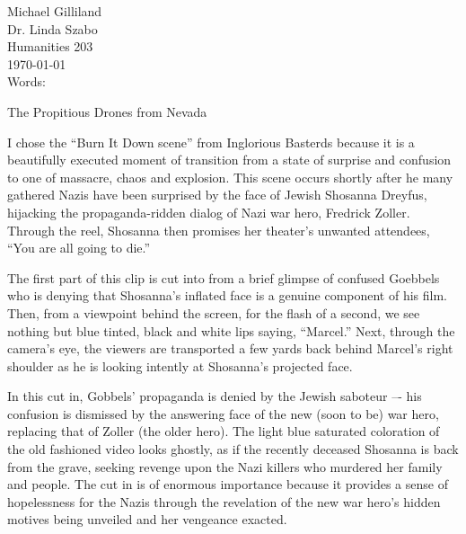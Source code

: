 \documentclass[12pt]{article}
\begin{document}
\begin{flushleft}

Michael Gilliland \\
Dr. Linda Szabo \\
Humanities 203 \\
\today \\
Words: \\

\begin{center}
{\large The Propitious Drones from Nevada}
\end{center}

\setlength{\parindent}{0.5in} 


I chose the “Burn It Down scene” from Inglorious Basterds because it is a 
beautifully executed moment of transition from a state of surprise and 
confusion to one of massacre, chaos and explosion. This scene occurs 
shortly after he many gathered Nazis have been surprised by the face of 
Jewish Shosanna Dreyfus, hijacking the propaganda-ridden dialog of Nazi war 
hero, Fredrick Zoller. Through the reel, Shosanna then promises her theater's 
unwanted attendees, “You are all going to die.”

The first part of this clip is cut into from a brief glimpse of confused 
Goebbels who is denying that Shosanna's inflated face is a genuine 
component of his film. Then, from a viewpoint behind the screen, for 
the flash of a second, we see nothing but blue tinted, black and white 
lips saying, “Marcel.” Next, through the camera's eye, the viewers are 
transported a few yards back behind Marcel's right shoulder as he is 
looking intently at Shosanna's projected face.

In this cut in, Gobbels' propaganda is denied by the Jewish saboteur –-
his confusion is dismissed by the answering face of the new (soon to be) 
war hero, replacing that of Zoller (the older hero). The light blue 
saturated coloration of the old fashioned video looks ghostly, as if the 
recently deceased Shosanna is back from the grave, seeking revenge upon 
the Nazi killers who murdered her family and people. The cut in is of 
enormous importance because it provides a sense of hopelessness for the 
Nazis through the revelation of the new war hero's hidden motives being 
unveiled and her vengeance exacted.


\end{flushleft}
\end{document}
